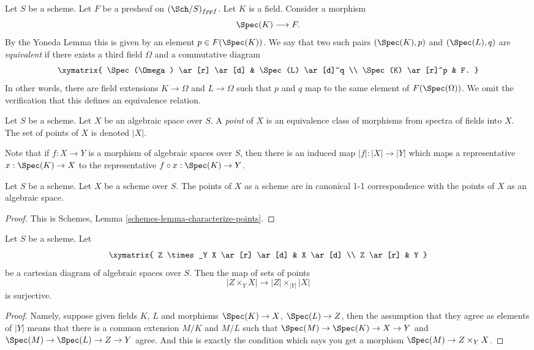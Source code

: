 \medskip\noindent
Let $S$ be a scheme.
Let $F$ be a presheaf on $(\Sch/S)_{fppf}$.
Let $K$ is a field. Consider a morphism
$$
\Spec(K) \longrightarrow F.
$$
By the Yoneda Lemma this is given by an
element $p \in F(\Spec(K))$. We say that two such
pairs $(\Spec(K), p)$ and $(\Spec(L), q)$
are {\it equivalent} if there exists
a third field $\Omega$ and a commutative diagram
$$
\xymatrix{
\Spec(\Omega) \ar[r] \ar[d] &
\Spec(L) \ar[d]^q \\
\Spec(K) \ar[r]^p &
F.
}
$$
In other words, there are field extensions
$K \to \Omega$ and $L \to \Omega$ such that
$p$ and $q$ map to the same element
of $F(\Spec(\Omega))$. We omit the verification that this
defines an equivalence relation.

\begin{definition}
\label{definition-points}
Let $S$ be a scheme. Let $X$ be an algebraic space over $S$.
A {\it point} of $X$ is an equivalence class of morphisms
from spectra of fields into $X$.
The set of points of $X$ is denoted $|X|$.
\end{definition}

\noindent
Note that if $f : X \to Y$ is a morphism of algebraic spaces
over $S$, then there is an induced map $|f| : |X| \to |Y|$ which
maps a representative $x : \Spec(K) \to X$ to the representative
$f \circ x : \Spec(K) \to Y$.

\begin{lemma}
\label{lemma-scheme-points}
Let $S$ be a scheme. Let $X$ be a scheme over $S$.
The points of $X$ as a scheme are in canonical 1-1 correspondence
with the points of $X$ as an algebraic space.
\end{lemma}

\begin{proof}
This is Schemes, Lemma \ref{schemes-lemma-characterize-points}.
\end{proof}

\begin{lemma}
\label{lemma-points-cartesian}
Let $S$ be a scheme. Let
$$
\xymatrix{
Z \times_Y X \ar[r] \ar[d] & X \ar[d] \\
Z \ar[r] & Y
}
$$
be a cartesian diagram of algebraic spaces over $S$. Then the map of sets
of points
$$
|Z \times_Y X|
\longrightarrow
|Z| \times_{|Y|} |X|
$$
is surjective.
\end{lemma}

\begin{proof}
Namely, suppose given fields $K$, $L$ and morphisms
$\Spec(K) \to X$, $\Spec(L) \to Z$, then the
assumption that they agree as elements of $|Y|$ means that
there is a common extension $M/K$ and $M/L$
such that
$\Spec(M) \to \Spec(K) \to X \to Y$ and
$\Spec(M) \to \Spec(L) \to Z \to Y$ agree.
And this is exactly the condition which says you get a
morphism $\Spec(M) \to Z \times_Y X$.
\end{proof}

